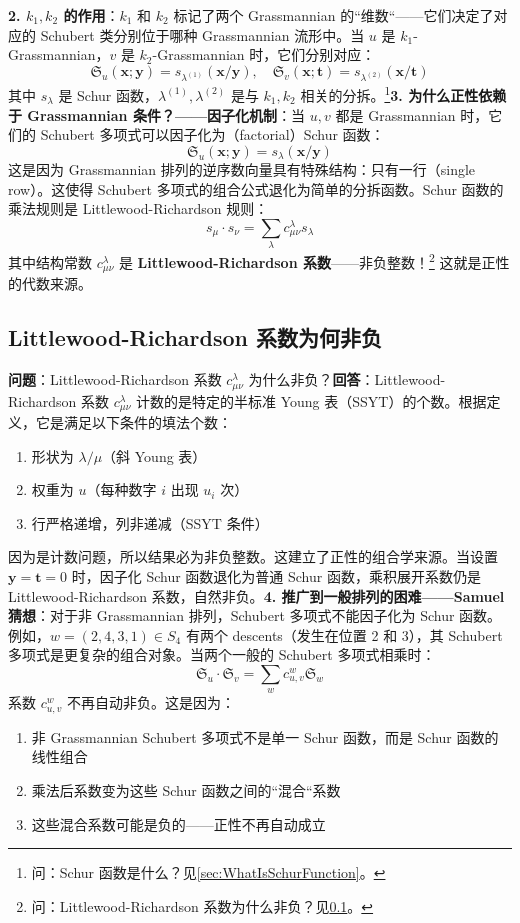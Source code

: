 \textbf{2. $k_1, k_2$ 的作用}：$k_1$ 和 $k_2$ 标记了两个 Grassmannian 的``维数``——它们决定了对应的 Schubert 类分别位于哪种 Grassmannian 流形中。当 $u$ 是 $k_1$-Grassmannian，$v$ 是 $k_2$-Grassmannian 时，它们分别对应：$$\mathfrak{S}_u(\mathbf{x}; \mathbf{y}) = s_{\lambda^{(1)}}(\mathbf{x}/\mathbf{y}), \quad \mathfrak{S}_v(\mathbf{x}; \mathbf{t}) = s_{\lambda^{(2)}}(\mathbf{x}/\mathbf{t})$$其中 $s_\lambda$ 是 Schur 函数，$\lambda^{(1)}, \lambda^{(2)}$ 是与 $k_1, k_2$ 相关的分拆。\footnote{问：Schur 函数是什么？见\cref{sec:WhatIsSchurFunction}。}\textbf{3. 为什么正性依赖于 Grassmannian 条件？——因子化机制}：当 $u, v$ 都是 Grassmannian 时，它们的 Schubert 多项式可以因子化为（factorial）Schur 函数：$$\mathfrak{S}_u(\mathbf{x}; \mathbf{y}) = s_{\lambda}(\mathbf{x}/\mathbf{y})$$这是因为 Grassmannian 排列的逆序数向量具有特殊结构：只有一行（single row）。这使得 Schubert 多项式的组合公式退化为简单的分拆函数。Schur 函数的乘法规则是 Littlewood-Richardson 规则：$$s_\mu \cdot s_\nu = \sum_\lambda c_{\mu\nu}^\lambda s_\lambda$$其中结构常数 $c_{\mu\nu}^\lambda$ 是 \textbf{Littlewood-Richardson 系数}——非负整数！\footnote{问：Littlewood-Richardson 系数为什么非负？见\cref{sec:LittlewoodRichardsonPositivity}。} 这就是正性的代数来源。
\subsection{Littlewood-Richardson 系数为何非负}\label{sec:LittlewoodRichardsonPositivity}\textbf{问题}：Littlewood-Richardson 系数 $c_{\mu\nu}^\lambda$ 为什么非负？\textbf{回答}：Littlewood-Richardson 系数 $c_{\mu\nu}^\lambda$ 计数的是特定的半标准 Young 表（SSYT）的个数。根据定义，它是满足以下条件的填法个数：
\begin{enumerate}
\item 形状为 $\lambda/\mu$（斜 Young 表）
\item 权重为 $u$（每种数字 $i$ 出现 $u_i$ 次）
\item 行严格递增，列非递减（SSYT 条件）
\end{enumerate}因为是计数问题，所以结果必为非负整数。这建立了正性的组合学来源。当设置 $\mathbf{y} = \mathbf{t} = 0$ 时，因子化 Schur 函数退化为普通 Schur 函数，乘积展开系数仍是 Littlewood-Richardson 系数，自然非负。\textbf{4. 推广到一般排列的困难——Samuel 猜想}：对于非 Grassmannian 排列，Schubert 多项式不能因子化为 Schur 函数。例如，$w = (2, 4, 3, 1) \in S_4$ 有两个 descents（发生在位置 2 和 3），其 Schubert 多项式是更复杂的组合对象。当两个一般的 Schubert 多项式相乘时：$$\mathfrak{S}_u \cdot \mathfrak{S}_v = \sum_w c^w_{u,v} \mathfrak{S}_w$$系数 $c^w_{u,v}$ 不再自动非负。这是因为：
\begin{enumerate}
\item 非 Grassmannian Schubert 多项式不是单一 Schur 函数，而是 Schur 函数的线性组合
\item 乘法后系数变为这些 Schur 函数之间的``混合``系数
\item 这些混合系数可能是负的——正性不再自动成立
\end{enumerate}

